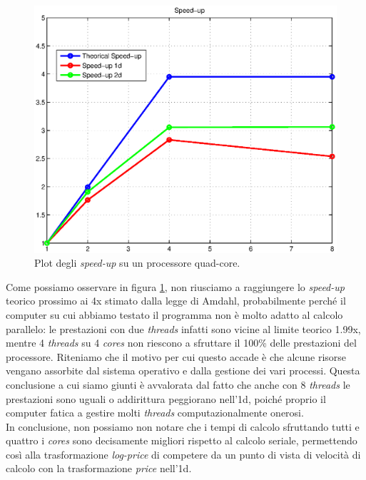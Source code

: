 \documentclass[a4paper,10pt]{report}
\theoremstyle{plain}
\theoremstyle{definition}
\theoremstyle{remark}
\begin{document}
\begin{figure}[htp!]
\begin{center}
\includegraphics[width=12cm]{img/test4-speedup.eps}
\caption{Plot degli \emph{speed-up} su un processore quad-core.}
\label{test4:speedup}
\end{center}
\end{figure}
Come possiamo osservare in figura \ref{test4:speedup}, non riusciamo a raggiungere lo \emph{speed-up} teorico prossimo ai 4x stimato dalla legge di Amdahl, probabilmente perch\'e il computer su cui abbiamo testato il programma non \`e molto adatto al calcolo parallelo: le prestazioni con due \emph{threads} infatti sono vicine al limite teorico 1.99x, mentre 4 \emph{threads} su 4 \emph{cores} non riescono a sfruttare il 100\% delle prestazioni del processore. Riteniamo che il motivo per cui questo accade \`e che alcune risorse vengano assorbite dal sistema operativo e dalla gestione dei vari processi. Questa conclusione a cui siamo giunti \`e avvalorata dal fatto che anche con 8 \emph{threads} le prestazioni sono uguali o addirittura peggiorano nell'1d, poich\'e proprio il computer fatica a gestire molti \emph{threads} computazionalmente onerosi.\\In conclusione, non possiamo non notare che i tempi di calcolo sfruttando tutti e quattro i \emph{cores} sono decisamente migliori rispetto al calcolo seriale, permettendo cos\`i alla trasformazione \emph{log-price} di competere da un punto di vista di velocit\`a di calcolo con la trasformazione \emph{price} nell'1d.
\newpage
\end{document}
